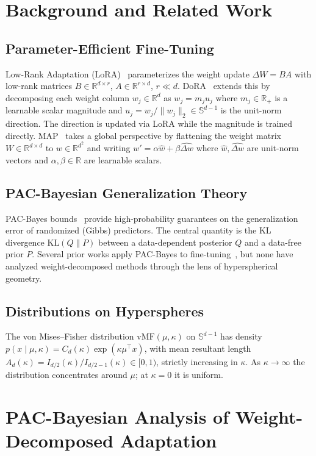 \documentclass[11pt]{article}
\newcommand{\KL}{\mathrm{KL}}
\newcommand{\vMF}{\mathrm{vMF}}
\newcommand{\Sd}{\mathbb{S}^{d-1}}
\newcommand{\R}{\mathbb{R}}
\begin{document}
\section{Background and Related Work}

\subsection{Parameter-Efficient Fine-Tuning}
Low-Rank Adaptation (LoRA)~\cite{lora} parameterizes the weight update
$\Delta W = BA$ with low-rank matrices $B \in \R^{d \times r}$, $A \in \R^{r \times d}$,
$r \ll d$. DoRA~\cite{dora} extends this by decomposing each weight column
$w_j \in \R^d$ as $w_j = m_j u_j$ where $m_j \in \R_+$ is a learnable scalar
magnitude and $u_j = w_j / \|w_j\|_2 \in \Sd$ is the unit-norm direction. The
direction is updated via LoRA while the magnitude is trained directly. MAP~\cite{map}
takes a global perspective by flattening the weight matrix $W \in \R^{d \times d}$ to
$w \in \R^{d^2}$ and writing $w' = \alpha \hat{w} + \beta \widehat{\Delta w}$ where
$\hat{w}, \widehat{\Delta w}$ are unit-norm vectors and $\alpha, \beta \in \R$ are
learnable scalars.

\subsection{PAC-Bayesian Generalization Theory}
PAC-Bayes bounds~\cite{mcallester,catoni} provide high-probability guarantees on the
generalization error of randomized (Gibbs) predictors. The central quantity is the
KL divergence $\KL(Q\|P)$ between a data-dependent posterior $Q$ and a data-free
prior $P$. Several prior works apply PAC-Bayes to fine-tuning~\cite{pactuning,sparse},
but none have analyzed weight-decomposed methods through the lens of hyperspherical
geometry.

\subsection{Distributions on Hyperspheres}
The von Mises--Fisher distribution $\vMF(\mu,\kappa)$ on $\Sd$ has density
$p(x\mid\mu,\kappa) = C_d(\kappa)\exp(\kappa\mu^\top x)$, with mean resultant length
$A_d(\kappa) = I_{d/2}(\kappa)/I_{d/2-1}(\kappa) \in [0,1)$, strictly increasing in
$\kappa$. As $\kappa \to \infty$ the distribution concentrates around $\mu$; at
$\kappa = 0$ it is uniform.

\section{PAC-Bayesian Analysis of Weight-Decomposed Adaptation}
\end{document}
